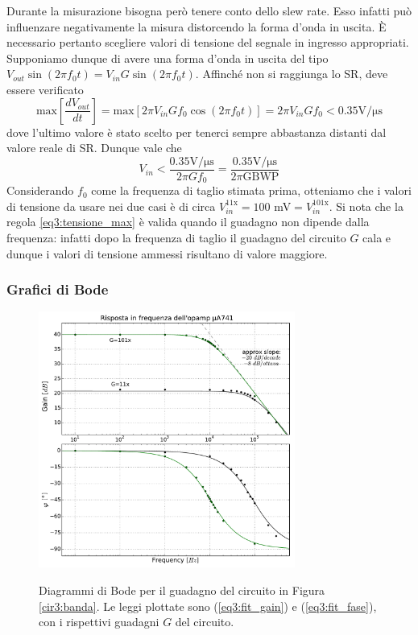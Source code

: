 Durante la misurazione bisogna però tenere conto dello slew rate.
Esso infatti può influenzare negativamente la misura distorcendo la forma d'onda in uscita.
È necessario pertanto scegliere valori di tensione del segnale in ingresso appropriati.
Supponiamo dunque di avere una forma d'onda in uscita del tipo $V_{out} \sin (2 \pi f_0 t) = V_{in} G \sin (2 \pi f_0 t)$.
Affinché non si raggiunga lo SR, deve essere verificato
$$\mathrm{max}\left[ \frac{dV_{out}}{dt} \right] = \mathrm{max} \left[ 2 \pi V_{in} G f_0 \cos (2 \pi f_0 t) \right]= 2 \pi V_{in} G f_0 < 0.35 \si{\volt\per\micro\second}$$
dove l'ultimo valore è stato scelto per tenerci sempre abbastanza distanti dal valore reale di SR. Dunque vale che
\begin{equation}
V_{in}<\frac{0.35 \si{\volt\per\micro\second}}{2 \pi G f_0} = \frac{0.35 \si{\volt\per\micro\second}}{2 \pi \mathrm{GBWP}}
\label{eq3:tensione_max}
\end{equation}
Considerando $f_0$ come la frequenza di taglio stimata prima, otteniamo che i valori di tensione da usare nei due casi è di circa $V_{in}^{11\mathrm{x}} = 100$ \si{\milli\volt}$= V_{in}^{101\mathrm{x}}$. Si nota che la regola \ref{eq3:tensione_max} è valida quando il guadagno non dipende dalla frequenza: infatti dopo la frequenza di taglio il guadagno del circuito $G$ cala e dunque i valori di tensione ammessi risultano di valore maggiore.

\subsubsection*{Grafici di Bode}
\label{par3:sub_bode}

\begin{figure}[ht]
 \centering
   {\includegraphics[width=0.75\textwidth]{../E03/latex/bode.pdf}}
 \caption{Diagrammi di Bode per il guadagno del circuito in Figura \ref{cir3:banda}. Le leggi plottate sono (\ref{eq3:fit_gain}) e (\ref{eq3:fit_fase}), con i rispettivi guadagni $G$ del circuito.}
 \label{gr3:bode}
\end{figure}

